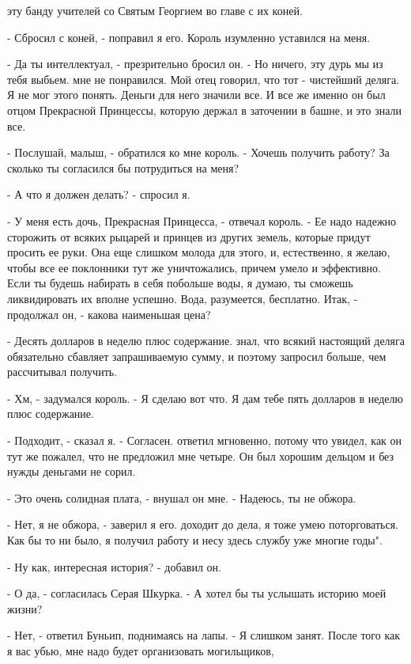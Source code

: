 эту банду учителей со Святым Георгием во главе с их коней.
\par- Сбросил с коней, - поправил я его. Король изумленно уставился на 
меня.
\par- Да ты интеллектуал, - презрительно бросил он. - Но ничего, эту 
дурь мы из тебя выбьем.
 мне не понравился. Мой отец говорил, что тот - чистейший 
деляга. Я не мог этого понять. Деньги для него значили все. И все же 
именно он был отцом Прекрасной Принцессы, которую держал в заточении в 
башне, и это знали все.
\par- Послушай, малыш, - обратился ко мне король. - Хочешь получить 
работу? За сколько ты согласился бы потрудиться на меня?
\par- А что я должен делать? - спросил я.
\par- У меня есть дочь, Прекрасная Принцесса, - отвечал король. - Ее 
надо надежно сторожить от всяких рыцарей и принцев из других земель, 
которые придут просить ее руки. Она еще слишком молода для этого, и, 
естественно, я желаю, чтобы все ее поклонники тут же уничтожались, 
причем умело и эффективно. Если ты будешь набирать в себя побольше 
воды, я думаю, ты сможешь ликвидировать их вполне успешно. Вода, 
разумеется, бесплатно. Итак, - продолжал он, - какова наименьшая цена?
\par- Десять долларов в неделю плюс содержание.
 знал, что всякий настоящий деляга обязательно сбавляет 
запрашиваемую сумму, и поэтому запросил больше, чем рассчитывал 
получить.
\par- Хм, - задумался король. - Я сделаю вот что. Я дам тебе пять 
долларов в неделю плюс содержание.
\par- Подходит, - сказал я. - Согласен.
 ответил мгновенно, потому что увидел, как он тут же пожалел, что 
не предложил мне четыре. Он был хорошим дельцом и без нужды деньгами 
не сорил.
\par- Это очень солидная плата, - внушал он мне. - Надеюсь, ты не 
обжора.
\par- Нет, я не обжора, - заверил я его.
 доходит до дела, я тоже умею поторговаться. Как бы то ни 
было, я получил работу и несу здесь службу уже многие годы".
\par- Ну как, интересная история? - добавил он.
\par- О да, - согласилась Серая Шкурка. - А хотел бы ты услышать 
историю моей жизни?
\par- Нет, - ответил Буньип, поднимаясь на лапы. - Я слишком занят. 
После того как я вас убью, мне надо будет организовать могильщиков, 
